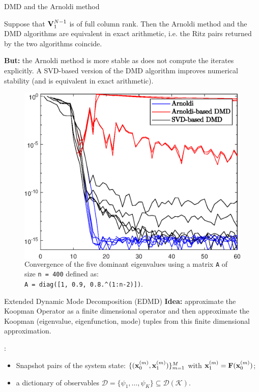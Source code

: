 \documentclass{beamer}
\begin{document}
\begin{frame}{DMD and the Arnoldi method}
\begin{prop}
Suppose that $\vb{V}_1^{N-1}$ is of full column rank. Then the Arnoldi method and the DMD algorithms are equivalent in exact arithmetic, i.e. the Ritz pairs returned by the two algorithms coincide. 
\end{prop}
\alert{\textbf{But:}} the Arnoldi method is more stable as does not compute the iterates explicitly. A SVD-based version of the DMD algorithm improves numerical stability (and is equivalent in exact arithmetic).
\begin{figure}[h]
    \begin{columns}
        \includegraphics[width=\linewidth]{../code/figures/Arnoldi_vs_DMD.eps}
        \caption{Convergence of the five dominant eigenvalues using a matrix \texttt{A} of size \texttt{n = 400} defined as:\\ \texttt{A = diag([1, 0.9, 0.8.\^{}(1:n-2)])}.}
      \end{columns}
\end{figure}
\end{frame}

\begin{frame}{Extended Dynamic Mode Decomposition (EDMD)}
\alert{\textbf{Idea:}} approximate the Koopman Operator as a finite dimensional operator and then approximate the Koopman (eigenvalue, eigenfunction, mode) tuples from this finite dimensional approximation. 

\medskip
{}:
\begin{itemize}
    \item Snapshot pairs of the system state: $\{(\vb{x}_0^{(m)}, \vb{x}_1^{(m)})\}_{m = 1}^M$ with $\vb{x}_1^{(m)} = \vb{F}(\vb{x}_0^{(m)})$;
    \item a dictionary of observables $\mathcal{D} = \{\psi_1, \dots, \psi_K\} \subseteq \mathcal{D}(\mathcal{K})$.
\end{itemize}
\end{frame}
\end{document}

